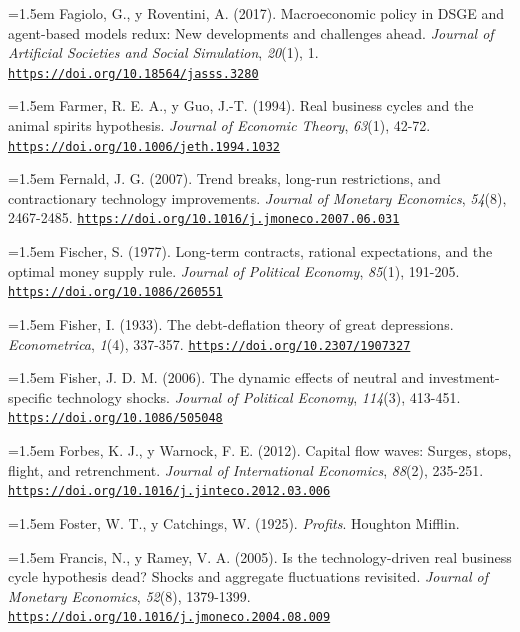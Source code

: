 \documentclass[10pt,a4paper]{article}
\begin{document}
{\sloppy\noindent\hangindent=1.5em Fagiolo, G., y Roventini, A. (2017). Macroeconomic policy in DSGE and agent-based models redux: New developments and challenges ahead. \textit{Journal of Artificial Societies and Social Simulation}, \textit{20}(1), 1. \href{https://doi.org/10.18564/jasss.3280}{\nolinkurl{https://doi.org/10.18564/jasss.3280}}\par}

\noindent\hangindent=1.5em Farmer, R. E. A., y Guo, J.-T. (1994). Real business cycles and the animal spirits hypothesis. \textit{Journal of Economic Theory}, \textit{63}(1), 42-72. \href{https://doi.org/10.1006/jeth.1994.1032}{\nolinkurl{https://doi.org/10.1006/jeth.1994.1032}}

\noindent\hangindent=1.5em Fernald, J. G. (2007). Trend breaks, long-run restrictions, and contractionary technology improvements. \textit{Journal of Monetary Economics}, \textit{54}(8), 2467-2485. \href{https://doi.org/10.1016/j.jmoneco.2007.06.031}{\nolinkurl{https://doi.org/10.1016/j.jmoneco.2007.06.031}}

\noindent\hangindent=1.5em Fischer, S. (1977). Long-term contracts, rational expectations, and the optimal money supply rule. \textit{Journal of Political Economy}, \textit{85}(1), 191-205. \href{https://doi.org/10.1086/260551}{\nolinkurl{https://doi.org/10.1086/260551}}

\noindent\hangindent=1.5em Fisher, I. (1933). The debt-deflation theory of great depressions. \textit{Econometrica}, \textit{1}(4), 337-357. \href{https://doi.org/10.2307/1907327}{\nolinkurl{https://doi.org/10.2307/1907327}}

\noindent\hangindent=1.5em Fisher, J. D. M. (2006). The dynamic effects of neutral and investment-specific technology shocks. \textit{Journal of Political Economy}, \textit{114}(3), 413-451. \href{https://doi.org/10.1086/505048}{\nolinkurl{https://doi.org/10.1086/505048}}

\noindent\hangindent=1.5em Forbes, K. J., y Warnock, F. E. (2012). Capital flow waves: Surges, stops, flight, and retrenchment. \textit{Journal of International Economics}, \textit{88}(2), 235-251. \href{https://doi.org/10.1016/j.jinteco.2012.03.006}{\nolinkurl{https://doi.org/10.1016/j.jinteco.2012.03.006}}

\noindent\hangindent=1.5em Foster, W. T., y Catchings, W. (1925). \textit{Profits}. Houghton Mifflin.

\noindent\hangindent=1.5em Francis, N., y Ramey, V. A. (2005). Is the technology-driven real business cycle hypothesis dead? Shocks and aggregate fluctuations revisited. \textit{Journal of Monetary Economics}, \textit{52}(8), 1379-1399. \href{https://doi.org/10.1016/j.jmoneco.2004.08.009}{\nolinkurl{https://doi.org/10.1016/j.jmoneco.2004.08.009}}
\end{document}
